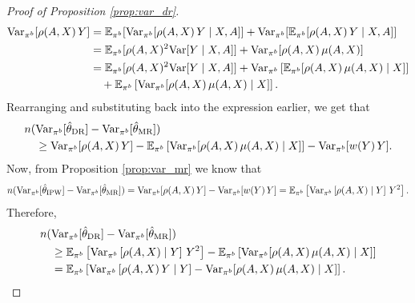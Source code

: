 \begin{proof}[Proof of Proposition \ref{prop:var_dr}]
\begin{align*}
    \textup{Var}_{\pi^b}[\rho(A, X)\,Y] &= \mathbb{E}_{\pi^b}[\textup{Var}_{\pi^b}[\rho(A, X)\,Y \mid X, A]] + \textup{Var}_{\pi^b}[\mathbb{E}_{\pi^b}[\rho(A, X)\,Y\mid X, A]]\\
    &= \mathbb{E}_{\pi^b}[\rho(A, X)^2\textup{Var}[Y \mid X, A]] + \textup{Var}_{\pi^b}[ \rho(A, X)\,\mu(A, X)]\\
    &= \mathbb{E}_{\pi^b}[\rho(A, X)^2\textup{Var}[Y \mid X, A]] + \textup{Var}_{\pi^b} \left[\mathbb{E}_{\pi^b}[\rho(A, X) \,\mu(A, X)\mid X]\right] \\
    &\quad+ \mathbb{E}_{\pi^b} \left[\textup{Var}_{\pi^b}[\rho(A, X) \,\mu(A, X)\mid X]\right].
\end{align*}
Rearranging and substituting back into the expression earlier, we get that
\begin{align*}
    &n (\textup{Var}_{\pi^b}[\hat{\theta}_{\textup{DR}}] - \textup{Var}_{\pi^b}[\hat{\theta}_{\textup{MR}}]) \\
    &\quad\geq \textup{Var}_{\pi^b}[\rho(A, X)\,Y] - \mathbb{E}_{\pi^b} \left[\textup{Var}_{\pi^b}[\rho(A, X) \,\mu(A, X)\mid X]\right] - \textup{Var}_{\pi^b}[w(Y)\,Y].
\end{align*}
Now, from Proposition \ref{prop:var_mr} we know that \begin{align*}
    n (\textup{Var}_{\pi^b}[\hat{\theta}_{\textup{IPW}}] - \textup{Var}_{\pi^b}[\hat{\theta}_{\textup{MR}}]) = \textup{Var}_{\pi^b}[\rho(A, X)\,Y] - \textup{Var}_{\pi^b}[w(Y)\,Y] = \mathbb{E}_{\pi^b} \left[ \textup{Var}_{\pi^b}\left[ \rho(A, X) \mid Y \right]\, Y^2 \right].
\end{align*}
Therefore, 
\begin{align*}
    &n (\textup{Var}_{\pi^b}[\hat{\theta}_{\textup{DR}}] - \textup{Var}_{\pi^b}[\hat{\theta}_{\textup{MR}}]) \\
    &\quad\geq \mathbb{E}_{\pi^b} \left[ \textup{Var}_{\pi^b}\left[ \rho(A, X) \mid Y \right]\, Y^2 \right] - \mathbb{E}_{\pi^b} \left[\textup{Var}_{\pi^b}[\rho(A, X) \,\mu(A, X)\mid X]\right]\\
    &\quad= \mathbb{E}_{\pi^b} \left[\textup{Var}_{\pi^b}\left[ \rho(A, X)\,Y \mid Y \right] - \textup{Var}_{\pi^b}[\rho(A, X) \,\mu(A, X)\mid X] \right].
\end{align*}
\end{proof}

